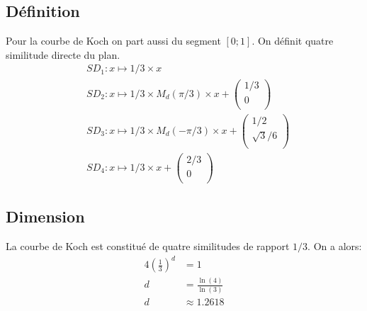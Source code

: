 \documentclass[a4paper, 12pt]{report}
\begin{document}
			\subsection{Définition}
				Pour la courbe de Koch on part aussi du segment $[0;1]$. On définit quatre similitude directe du plan.
				\begin{align*}
					&SD_1:x\mapsto 1/3\times x\\
					&SD_2:x\mapsto 1/3\times M_d(\pi/3)\times x+\left(	\begin{array}{ccc}
															1/3\\
															0\\
														\end{array}\right)\\
					&SD_3:x\mapsto 1/3\times M_d(-\pi/3)\times x+\left(	\begin{array}{ccc}
															1/2\\
															\sqrt{3}/6\\
														\end{array}\right)\\
					&SD_4:x\mapsto 1/3\times x+\left(	\begin{array}{ccc}
															2/3\\
															0\\
														\end{array}\right)
				\end{align*}
			\subsection{Dimension}
				La courbe de Koch est constitué de quatre similitudes de rapport $1/3$. On a alors:
				\begin{align*}
					 4\left(\frac{1}{3}\right)^d	&=1\\
												d	&=\frac{\ln(4)}{\ln(3)}\\
												d	&\approx 1.2618
				\end{align*}
\newpage
\end{document}
